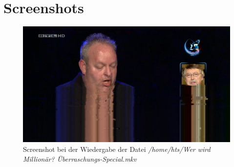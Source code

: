 \section{Screenshots}

\begin{figure}[H]
\includegraphics[scale=0.5]{rtlhd-millionaer.png} 
\caption{Screenshot bei der Wiedergabe der Datei \textit{/home/hts/Wer wird Millionär? Überraschungs-Special.mkv}}
\label{fig:tvheadend-rtlhd}
\end{figure}
